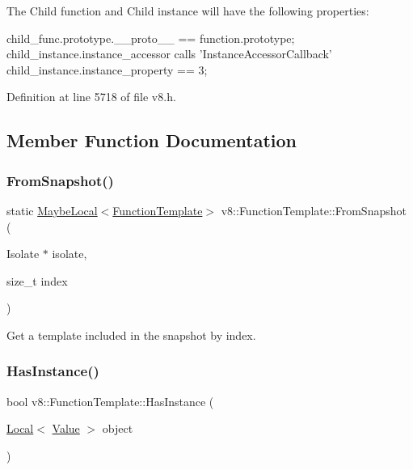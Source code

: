 The Child function and Child instance will have the following properties\+:


\begin{DoxyCode}
child\_func.prototype.\_\_proto\_\_ == \textcolor{keyword}{function}.prototype;
child\_instance.instance\_accessor calls \textcolor{stringliteral}{'InstanceAccessorCallback'}
child\_instance.instance\_property == 3;
\end{DoxyCode}
 

Definition at line 5718 of file v8.\+h.



\subsection{Member Function Documentation}
\mbox{\label{classv8_1_1FunctionTemplate_acd9eaca4c7d6de89949b8e1c41f4ba46}} 
\subsubsection{\texorpdfstring{From\+Snapshot()}{FromSnapshot()}}
{\footnotesize\ttfamily static \mbox{\hyperlink{classv8_1_1MaybeLocal}{Maybe\+Local}}$<$\mbox{\hyperlink{classv8_1_1FunctionTemplate}{Function\+Template}}$>$ v8\+::\+Function\+Template\+::\+From\+Snapshot (\begin{DoxyParamCaption}\item[{Isolate $\ast$}]{isolate,  }\item[{size\+\_\+t}]{index }\end{DoxyParamCaption})\hspace{0.3cm}{\ttfamily [static]}}

Get a template included in the snapshot by index. \mbox{\label{classv8_1_1FunctionTemplate_a90d838f3456d300bd19d2a2cb98645bd}} 
\subsubsection{\texorpdfstring{Has\+Instance()}{HasInstance()}}
{\footnotesize\ttfamily bool v8\+::\+Function\+Template\+::\+Has\+Instance (\begin{DoxyParamCaption}\item[{\mbox{\hyperlink{classv8_1_1Local}{Local}}$<$ \mbox{\hyperlink{classv8_1_1Value}{Value}} $>$}]{object }\end{DoxyParamCaption})}

